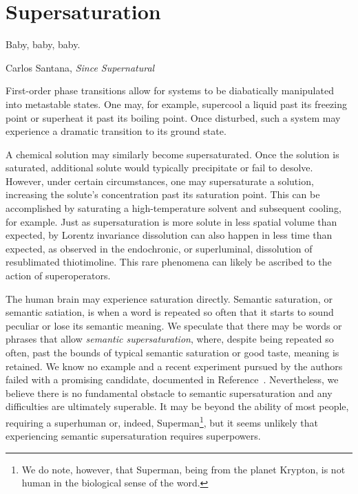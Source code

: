 \section{Supersaturation}

\epigraph{Baby, baby, baby.
}{Carlos Santana, \textit{Since Supernatural}}

First-order phase transitions allow for systems to be diabatically manipulated into metastable states.
One may, for example, supercool a liquid past its freezing point or superheat it past its boiling point.
Once disturbed, such a system may experience a dramatic transition to its ground state.

A chemical solution may similarly become supersaturated.
Once the solution is saturated, additional solute would typically precipitate or fail to desolve.
However, under certain circumstances, one may supersaturate a solution, increasing the solute's concentration past its saturation point.
This can be accomplished by saturating a high-temperature solvent and subsequent cooling, for example.
Just as supersaturation is more solute in less spatial volume than expected, by Lorentz invariance dissolution can also happen in less time than expected, as observed in the endochronic, or superluminal, dissolution of resublimated thiotimoline\cite{asimov:1948,asimov:1953,asimov:1960,vernon:2022}.
This rare phenomena can likely be ascribed to the action of superoperators\cite{Deutsch:1991nm}.

The human brain may experience saturation directly.
Semantic saturation, or semantic satiation, is when a word is repeated so often that it starts to sound peculiar or lose its semantic meaning.
We speculate that there may be words or phrases that allow \emph{semantic supersaturation}, where, despite being repeated so often, past the bounds of typical semantic saturation or good taste, meaning is retained.
We know no example and a recent experiment pursued by the authors failed with a promising candidate, documented in Reference~\cite{self}.
Nevertheless, we believe there is no fundamental obstacle to semantic supersaturation and any difficulties are ultimately superable.
It may be beyond the ability of most people, requiring a superhuman or, indeed, Superman\footnote{We do note, however, that Superman, being from the planet Krypton, is not human in the biological sense of the word.}\cite{tippett:2009}, but it seems unlikely that experiencing semantic supersaturation requires superpowers.
